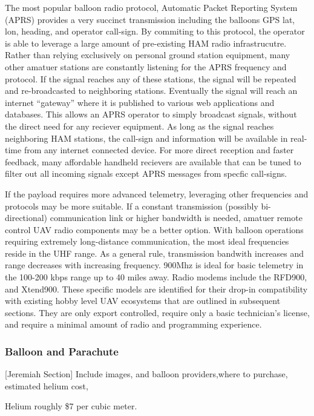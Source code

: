 \documentclass[heading.tex]{subfiles}
\begin{document}
The most popular balloon radio protocol, Automatic Packet Reporting System (APRS)
provides a very succinct transmission including the balloons GPS lat, lon, heading,
and operator call-sign. By commiting to this protocol, the operator is able to
leverage a large amount of pre-existing HAM radio infrastrucutre. Rather than
relying exclusively on personal ground station equipment, many other amatuer
stations are constantly listening for the APRS frequency and protocol. If the
signal reaches any of these stations, the signal will be repeated and re-broadcasted
to neighboring stations. Eventually the signal will reach an internet ``gateway''
where it is published to various web applications and databases.
This allows an APRS operator to simply broadcast signals,
without the direct need for any reciever equipment.
As long as the signal reaches neighboring HAM stations, the call-sign and information
will be available in real-time from any internet connected device.
For more direct reception and faster feedback,
many affordable handheld recievers are available that can
be tuned to filter out all incoming signals except APRS messages from specfic
call-signs.

If the payload requires more advanced telemetry, leveraging other frequencies
and protocols may be more suitable. If a constant transmission
(possibly bi-directional) communication link or higher bandwidth is needed,
amatuer remote control UAV radio components may be a better option.
With balloon operations requiring extremely long-distance communication,
the most ideal frequencies reside in the UHF range.
As a general rule, transmission bandwith increases and range decreases with
increasing frequency. 900Mhz is ideal for
basic telemetry in the 100-200 kbps range up to 40 miles away. Radio modems
include the RFD900, and Xtend900. These specific models are identified for their
drop-in compatibility with existing hobby level UAV ecosystems that are outlined
in subsequent sections. They are only export controlled, require only
a basic technician's license, and require a minimal amount of radio and 
programming experience.

\subsubsection{Balloon and Parachute}

[Jeremiah Section]
Include images, and balloon providers,where to purchase, estimated helium cost,

Helium roughly \$7 per cubic meter.
\end{document}
